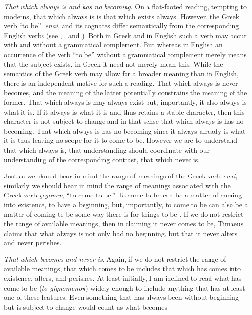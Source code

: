 \emph{That which always is and has no becoming}. On a flat-footed reading, tempting to moderns, that which always is is that which exists always. However, the Greek verb ``to be'', \emph{enai}, and its cognates differ semantically from the corresponding English verbs (see \citealt{Kahn:2009kx}, \citealt{Brown:1994aa}, and \citealt{Leigh:2008aa}). Both in Greek and in English such a verb may occur with and without a grammatical complement. But whereas in English an occurrence of the verb ``to be'' without a grammatical complement merely means that the subject exists, in Greek it need not merely mean this. While the semantics of the Greek verb may allow for a broader meaning than in English, there is an independent motive for such a reading. That which always is never becomes, and the meaning of the latter potentially constrains the meaning of the former. That which always is may always exist but, importantly, it also always is what it is. If it always is what it is and thus retains a stable character, then this character is not subject to change and in that sense that which always is has no becoming. That which always is has no becoming since it always already is what it is thus leaving no scope for it to come to be. However we are to understand that which always is, that understanding should coordinate with our understanding of the corresponding contrast, that which never is.

Just as we should bear in mind the range of meanings of the Greek verb \emph{enai}, similarly we should bear in mind the range of meanings associated with the Greek verb \emph{gegonen}, ``to come to be.'' To come to be can be a matter of coming into existence, to have a beginning, but, importantly, to come to be can also be a matter of coming to be some way there is for things to be \citep[24--5]{Cornford:1935fk}. If we do not restrict the range of available meanings, then in claiming it never comes to be, Timaeus claims that what always is not only had no beginning, but that it never alters and never perishes.

\emph{That which becomes and never is}. Again, if we do not restrict the range of available meanings, that which comes to be includes that which has comes into existence, alters, and perishes. At least initially, I am inclined to read what has come to be (\emph{to gignomenon}) widely enough to include anything that has at least one of these features. Even something that has always been without beginning but is subject to change would count as what becomes.

